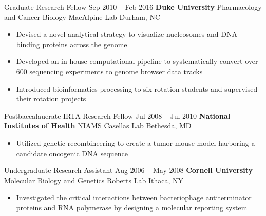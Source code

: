 
\begin{resentries}

  \resentrybeta
    {Graduate Research Fellow}
    {Sep 2010 -- Feb 2016}
    {\textbf{Duke University} \xspace \bullet \xspace \xspace Pharmacology and Cancer Biology \xspace \bullet \xspace \xspace MacAlpine Lab} %
    {Durham, NC} %
    {
      \begin{itemize}[leftmargin=*, itemsep=-1.5mm] %
        \item{Devised a novel analytical strategy to visualize nucleosomes and DNA-binding proteins across the genome}
        \item{Developed an in-house computational pipeline to systematically convert over 600 sequencing experiments to genome browser data tracks}
        \item{Introduced bioinformatics processing to six rotation students and supervised their rotation projects}
      \end{itemize}
    }

  \resentrybeta
    {Postbaccalauerate IRTA Research Fellow}
    {Jul 2008 -- Jul 2010}
    {\textbf{National Institutes of Health} \xspace \bullet \xspace \xspace NIAMS \xspace \bullet \xspace \xspace Casellas Lab}
    {Bethesda, MD}
    {
      \begin{itemize}[leftmargin=*, itemsep=-1.5mm]
        \item{Utilized genetic recombineering to create a tumor mouse model harboring a candidate oncogenic DNA sequence}
      \end{itemize}
    }

  \resentrybeta
    {Undergraduate Research Assistant}
    {Aug 2006 -- May 2008}
    {\textbf{Cornell University} \xspace \bullet \xspace \xspace Molecular Biology and Genetics \xspace \bullet \xspace \xspace Roberts Lab}
    {Ithaca, NY}
    {
      \begin{itemize}[leftmargin=*, itemsep=-1.5mm]
        \item{Investigated the critical interactions between bacteriophage antiterminator proteins and RNA polymerase by designing a molecular reporting system}
      \end{itemize}
    }

\end{resentries}
